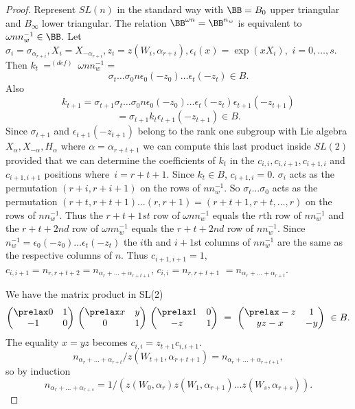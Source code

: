 \documentclass{memo-l}
\theoremstyle{definition}
\theoremstyle{remark}
\numberwithin{section}{chapter}
\numberwithin{equation}{chapter}
\begin{document}
\begin{proof}    Represent $SL(n)$ in the standard way with ${\BB} =
B_{0}$ upper triangular and $B_{{\infty}}$ lower triangular.
 The relation ${\BB}^{\omega n}  =
{\BB}^{n_w}$  is equivalent to ${\omega}nn_{w}^{-1}
\in {\BB}$.
 Let ${\sigma}_{i} = {\sigma}_{\alpha_{r+i}},
X_{i} = X_{-{\alpha}_{r+i}}, z_{i} = z(W_{i},{\alpha}_{r+i}),
{\epsilon}_{i}(x) = \exp(xX_{i})$,\ $i=0,\ldots ,s$.
 Then $k_{t}\ {\mathrel{\mathop =^{(def)}}}\ {\omega}nn_{w}^{-1} =$
$$
{\sigma}_{t}\ldots {\sigma}_{0}n{\epsilon}_{0}(-z_{0})\ldots {\epsilon}_{t}(-z_{t})
\in B .
$$
Also
$$
k_{t+1} = {\sigma}_{t+1}{\sigma}_{t}\ldots {\sigma}_{0}n{\epsilon}_{0}(-z_{0})
\ldots {\epsilon}_{t}(-z_{t}){\epsilon}_{t+1}(-z_{t+1})
$$
$$
= {\sigma}_{t+1}k_{t}{\epsilon}_{t+1}(-z_{t+1}) \in B .
$$
Since ${\sigma}_{t+1}$ and ${\epsilon}_{t+1}(-z_{t+1})$ belong to the rank
one subgroup with Lie algebra $X_{{\alpha}}, X_{-{\alpha}}, H_{{\alpha}}$
where ${\alpha} = {\alpha}_{r+t+1}$  we can compute this last
product inside $SL(2)$ provided that we can determine the coefficients of
$k_{t}$ in the $c_{i,i}, c_{i,i+1}, c_{i+1,i}$ and $c_{i+1,i+1}$
positions where\ $i = r+t+1$.	 Since $k_{t} \in B$,
$c_{i+1,i} = 0$.
 ${\sigma}_{i}$ acts as the permutation $(r+i,r+i+1)$ on the rows of
$nn_{w}^{-1}$.
 So ${\sigma}_{t}\ldots {\sigma}_{0}$ acts as the permutation
$(r+t,r+t+1)\ldots (r,r+1) = (r+t+1,r+t,\ldots ,r)$ on the rows of $nn_{w}^{-1}$.
 Thus the $r+t+1st$ row of ${\omega}nn_{w}^{-1}$ equals the $r$th row of
$nn_{w}^{-1}$ and the $r+t+2nd$ row of ${\omega}nn_{w}^{-1}$ equals the
$r+t+2nd$ row of $nn_{w}^{-1}$.
 Since $n_{w}^{-1} = {\epsilon}_{0}(-z_{0})\ldots {\epsilon}_{t}(-z_{t})$ the
$i$th and $i+1$st columns of $nn_{w}^{-1}$ are the same as the respective
columns of $n$.
 Thus $c_{i+1,i+1} = 1$, $c_{i,i+1} = n_{r,r+t+2}  =
n_{\alpha_r+\ldots +\alpha_{r+t+1}}$, $c_{i,i} = n_{r,r+t+1}$ $ =
n_{\alpha_r+\ldots + \alpha_{r+t}}.$

   We have the matrix product in SL(2)
$$
{\begin{pmatrix} \prelax
 0 & 1 \\ -1 & 0 \end{pmatrix}}\
{\begin{pmatrix} \prelax  x & y \\ 0 & 1 \end{pmatrix}}\ {\begin{pmatrix} \prelax
1 & 0 \\ -z & 1 \end{pmatrix}}\ =\
{\begin{pmatrix} \prelax
 -z & 1 \\ yz-x & -y \end{pmatrix}}\
\in B .
$$
The equality $x = yz$ becomes $c_{i,i} = z_{t+1}c_{i,i+1}$.
$$
n_{\alpha_r+\ldots +\alpha_{r+t}}/z(W_{t+1},
{\alpha}_{r+t+1}) = n_{\alpha_r+\ldots +\alpha_{r+t+1}},
$$
so by induction
$$
n_{\alpha_r+\ldots +\alpha_{r+s}}  =
1/(z(W_{0},{\alpha}_{r})z(W_{1},{\alpha}_{r+1})\ldots z(W_{s},{\alpha}_{r+s})).
$$
\end{proof}
{\medskip}
\end{document}
